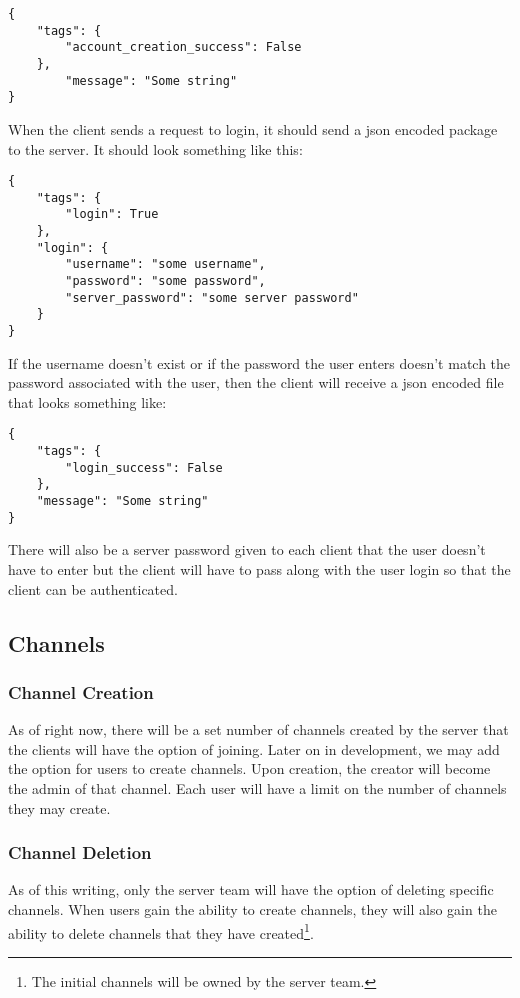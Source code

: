 \begin{lstlisting}[style=json]
{
    "tags": {
        "account_creation_success": False
    },
        "message": "Some string"
}
\end{lstlisting}
When the client sends a request to login, it should send a \gls{json} encoded package to the server. It should look something like this:

\begin{lstlisting}[style=json]
{
    "tags": {
        "login": True
    },
    "login": {
        "username": "some username",
        "password": "some password",
        "server_password": "some server password"
    }
}
\end{lstlisting}

If the username doesn't exist or if the password the user enters doesn't match the password associated with the user, then the client will receive a \gls{json} encoded file that looks something like:

\begin{lstlisting}[style=json]
{
    "tags": {
        "login_success": False
    },
    "message": "Some string"
}
\end{lstlisting}

There will also be a server password given to each client that the user doesn't have to enter but the client will have to pass along with the user login so that the client can be authenticated.

\subsection{Channels}
\subsubsection{Channel Creation}
As of right now, there will be a set number of channels created by the server that the clients will have the option of joining. Later on in development, we may add the option for users to create channels. Upon creation, the creator will become the admin of that channel. Each user will have a limit on the number of channels they may create.

\subsubsection{Channel Deletion}
As of this writing, only the server team will have the option of deleting specific channels. When users gain the ability to create channels, they will also gain the ability to delete channels that they have created\footnote{The initial channels will be owned by the server team.}.


